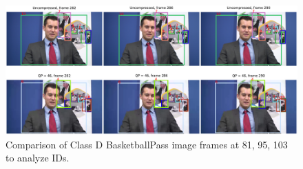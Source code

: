 \begin{figure}[!htbp]
  \centering
  \includegraphics[width=1.0\linewidth]{img/Johnny_0_IDs.pdf}
  \caption[Comparison of Class D BasketballPass image frames at 81, 95, 103 to analyze IDs]
  {
  Comparison of Class D BasketballPass image frames at 81, 95, 103 to analyze IDs.
  }
  \label{fig:Johnny_0_IDs}
\end{figure}